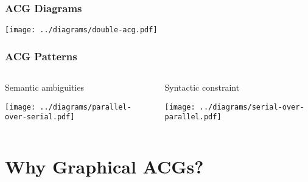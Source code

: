 \documentclass{beamer}
\begin{document}
\begin{frame}
  \frametitle{ACG Diagrams}

  \begin{center}
    \texttt{[image: ../diagrams/double-acg.pdf]}
  \end{center}
\end{frame}


\begin{frame}
  \frametitle{ACG Patterns}

  \begin{columns}[c]
    \begin{column}{0.5\textwidth}
      \begin{block}{Semantic ambiguities}
        \vspace{2 mm}
        \begin{center}
          \texttt{[image: ../diagrams/parallel-over-serial.pdf]}
        \end{center}
      \end{block}
    \end{column}
    \begin{column}{0.5\textwidth}
      \begin{block}{Syntactic constraint}
        \vspace{2 mm}
        \begin{center}
          \texttt{[image: ../diagrams/serial-over-parallel.pdf]}
        \end{center}
      \end{block}
    \end{column}
  \end{columns}
\end{frame}


\section{Why Graphical ACGs?}
\end{document}
